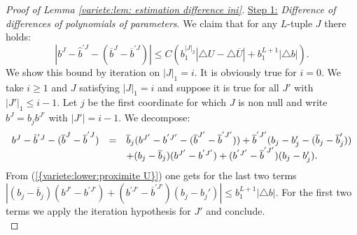 \documentclass[11pt,a4paper,reqno]{amsart}
\theoremstyle{remark}
\numberwithin{equation}{section}
\begin{document}
\begin{proof}[Proof of Lemma \ref{variete:lem: estimation difference ini}]
\underline{Step 1:} \emph{Difference of differences of polynomials of parameters}. We claim that for any $L$-tuple $J$ there holds:
\begin{equation} \label{variete:removal:eq:difference polynomes parametres}
|b^J-\hat{b}^{'J}-({{\overline {b}}}^J-{{\overline {b}}}^{'J})|\leq C (b_1^{|J|_2} |\triangle U-\triangle {{\overline {U}}}|+b_1^{L+1}|\triangle b|).
\end{equation}
We show this bound by iteration on $|J|_1=i$. It is obviously true for $i=0$. We take $i\geq 1$ and $J$ satisfying $|J|_1=i$ and suppose it is true for all $J'$ with $|J'|_1\leq i-1$. Let $j$ be the first coordinate for which $J$ is non null and write $b^J=b_jb^{J'}$ with $|J'|= i-1$. We decompose:
$$
\begin{array}{r c l}
b^J-\hat{b}^{'J}-({{\overline {b}}}^J-{{\overline {b}}}^{'J})&=&{{\overline {b}}}_j(b^{J'}-b^{'J'}-({{\overline {b}}}^{J'}-{{\overline {b}}}^{'J'}))+{{\overline {b}}}^{'J'}(b_j-b'_j-({{\overline {b}}}_j-{{\overline {b}}}'_j))\\
&&+(b_j-{{\overline {b}}}_j)(b^{J'}-b^{'J'})+(b^{'J'}-{{\overline {b}}}^{'J'})(b_j-b_j').
\end{array}
$$
From {{\rm (\ref{{variete:lower:proximite U}})}} one gets for the last two terms $|(b_j-{{\overline {b}}}_j)(b^{J'}-b^{'J'})+(b^{'J'}-{{\overline {b}}}^{'J'})(b_j-b_j')|\leq b_1^{L+1}|\triangle b|$. For the first two terms we apply the iteration hypothesis for $J'$ and conclude. \\


\end{proof}
\end{document}
